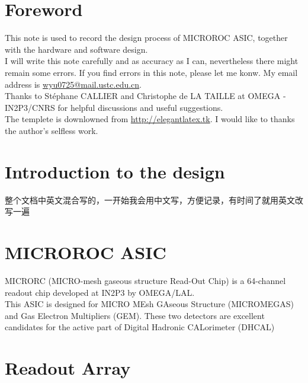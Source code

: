 \documentclass[color=green,mathpazo,titlestyle=hang,11pt]{elegantbook}
\author{Yu Wang}
\begin{document}
\maketitle
\frontmatter
\chapter*{Foreword}
This note is used to record the design process of MICROROC ASIC, together with the hardware and software design.\\
I will write this note carefully and as accuracy as I can, nevertheless there might remain some errors. If you find errors in this note, please let me konw. My email address is \href{wyu0725@mail.ustc.edu.cn}{wyu0725@mail.ustc.edu.cn}.\\
Thanks to St\'ephane CALLIER and Christophe de LA TAILLE at OMEGA - IN2P3/CNRS for helpful discussions and useful suggestions.\\
The templete is downlowned from \href{http://elegantlatex.tk}{http://elegantlatex.tk}. I would like to thanks the author's selfless work.
\tableofcontents

\mainmatter
\chapter{Introduction to the design}
整个文档中英文混合写的，一开始我会用中文写，方便记录，有时间了就用英文改写一遍
\chapter{MICROROC ASIC}

MICRORC (MICRO-mesh gaseous structure Read-Out Chip) is a 64-channel readout chip developed at IN2P3 by OMEGA/LAL. \\
This ASIC is designed for MICRO MEsh GAseous Structure (MICROMEGAS) and Gas Electron Multipliers (GEM). These two detectors are excellent candidates for the active part of Digital Hadronic CALorimeter (DHCAL)

\chapter{Readout Array}
\end{document}
